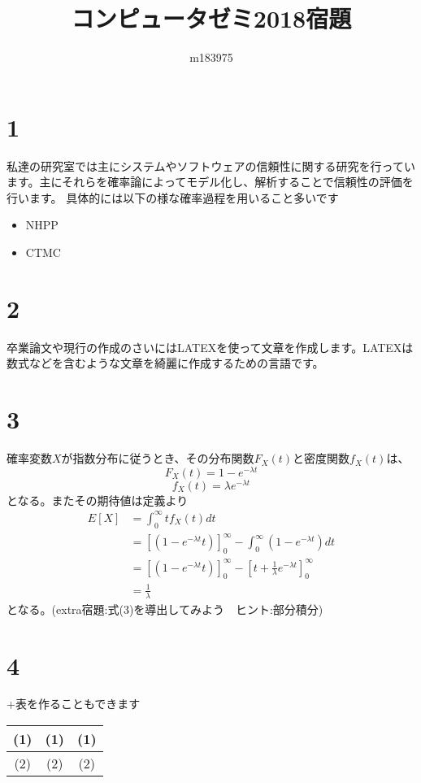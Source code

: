 \documentclass[a4paper,12pt]{article}
\title{コンピュータゼミ2018宿題}
\author{m183975}
\begin{document}
\maketitle
\section{1}
私達の研究室では主にシステムやソフトウェアの信頼性に関する研究を行っています。主にそれらを確率論によってモデル化し、解析することで信頼性の評価を行います。
具体的には以下の様な確率過程を用いること多いです
\begin{itemize}
  \item NHPP
  \item CTMC
\end{itemize}
\section{2}
卒業論文や現行の作成のさいにはLATEXを使って文章を作成します。LATEXは数式などを含むような文章を綺麗に作成するための言語です。
\section{3}
確率変数$X$が指数分布に従うとき、その分布関数$F_{X}(t)$と密度関数$f_{X}(t)$は、
\begin{equation}
  F_{X}(t) = 1-e^{-{\lambda}t}
\end{equation}
\begin{equation}
  f_{X}(t) = {\lambda}e^{-{\lambda}t}
\end{equation}
となる。またその期待値は定義より
\begin{equation}
\begin{aligned}
E[X]&=\int_{0}^{\infty}tf_{X}(t)dt\\
&=[(1-e^{-{\lambda}t}t)]^\infty_{0}-\int_{0}^{\infty}(1-e^{-{\lambda}t})dt\\
&=[(1-e^{-{\lambda}t}t)]^\infty_{0}-[t+\frac{1}{\lambda}e^{-{\lambda}t}]^\infty_{0}\\
&=\frac{1}{\lambda}
\end{aligned}
\end{equation}
となる。(extra宿題:式(3)を導出してみよう　ヒント:部分積分)
\section{4}
+表を作ることもできます
\begin{table}[!hbt]  
  \centering  
\begin{tabular}{|c|c|c|}
\hline  
(1)&(1)&(1)\\
\hline  
(2)&(2)&(2)\\
\hline 
\end{tabular}
\end{table} 
\end{document}
